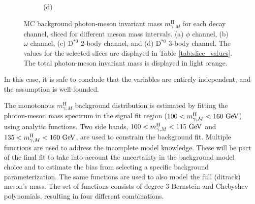 \begin{figure}[!ht]
\begin{subfigure}[t]{0.50\mylength}
        \vspace*{-0.2cm}
        \caption{\footnotesize (d)}
    \end{subfigure}%
\caption{MC background photon-meson invariant mass $m^{\text{H}}_{\gamma, M}$ for each decay channel, sliced for different meson mass intervals. (a) $\phi$ channel, (b) $\omega$ channel, (c) $\text{D}^{*0}$ 2-body channel, and (d) $\text{D}^{*0}$ 3-body channel. The values for the selected slices are displayed in Table \ref{tab:slice_values}. The total photon-meson invariant mass is displayed in light orange.}
\label{fig:bkg_modelling_sliced}
    \vspace*{-0.0cm}
\end{figure}
In this case, it is safe to conclude that the variables are entirely independent, and the assumption is well-founded.

The monotonous $m^{\text{H}}_{\gamma, M}$ background distribution is estimated by fitting the photon-meson mass spectrum in the signal fit region ($100 < m^{\text{H}}_{\gamma, M} < 160\ \text{GeV}$) using analytic functions. Two side bands, $100 < m^{\text{H}}_{\gamma, M} < 115\ \text{GeV}$ and $135 < m^{\text{H}}_{\gamma, M} < 160\ \GeV$, are used to constrain the background fit. Multiple functions are used to address the incomplete model knowledge. These will be part of the final fit to take into account the uncertainty in the background model choice and to estimate the bias from selecting a specific background parameterization. The same functions are used to also model the full (ditrack) meson's mass. The set of functions consists of degree 3 Bernstein and Chebyshev polynomials, resulting in four different combinations.

